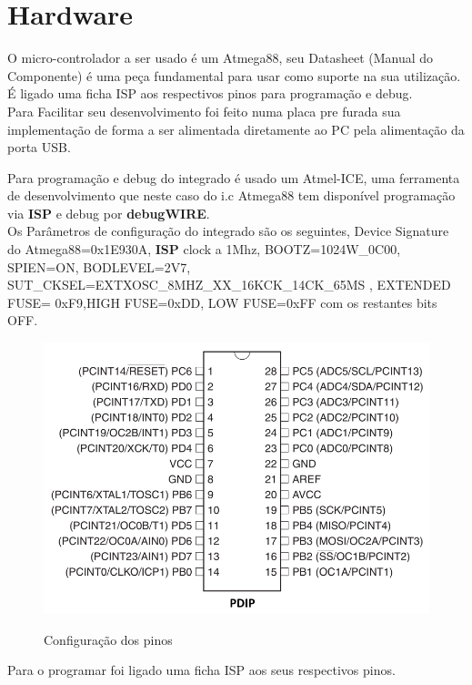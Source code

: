 \documentclass[titlepage, a4paper, 10pt, reqno, openany]{report}
\begin{document}
	\section{Hardware}
	O micro-controlador a ser usado \'{e} um Atmega88, seu Datasheet (Manual do Componente) \'{e} uma pe\c{c}a fundamental para usar como suporte na sua utiliza\c{c}\~{a}o. \'{E} ligado uma ficha ISP aos respectivos pinos para programa\c{c}\~{a}o e debug. \\
	Para Facilitar seu desenvolvimento foi feito numa placa pre furada sua implementa\c{c}\~{a}o de forma a ser alimentada diretamente ao PC pela alimenta\c{c}\~{a}o da porta USB. \par
	Para programa\c{c}\~{a}o e debug do integrado \'{e} usado um Atmel-ICE, uma ferramenta de desenvolvimento que neste caso do i.c Atmega88 tem dispon\'{i}vel programa\c{c}\~{a}o via {\bf ISP} e debug por {\bf debugWIRE}. \\
	Os Par\^{a}metros de configura\c{c}\~{a}o do integrado s\~{a}o os seguintes, Device Signature do Atmega88=0x1E930A, {\bf ISP} clock a 1Mhz, BOOTZ=1024W\_0C00, SPIEN=ON, BODLEVEL=2V7, SUT\_CKSEL=EXTXOSC\_8MHZ\_XX\_16KCK\_14CK\_65MS , EXTENDED FUSE= 0xF9,HIGH FUSE=0xDD, LOW FUSE=0xFF com os restantes bits OFF. \\
	\begin{figure}[H]
		\centering
		\includegraphics[scale=0.75]{./image/PACKAGE/Configuracao_pin.png}\\
		\caption{Configura\c{c}\~{a}o dos pinos}
	\end{figure}
	Para o programar foi ligado uma ficha ISP aos seus respectivos pinos. \\
\end{document}
